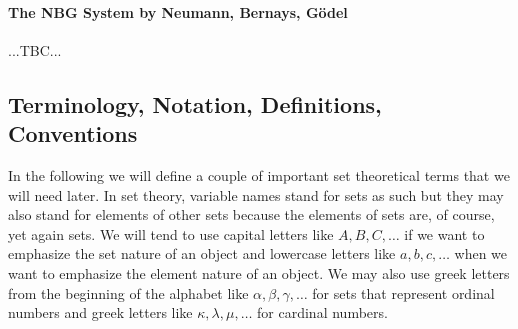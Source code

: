 

\paragraph{The NBG System by Neumann, Bernays, Gödel} ...TBC...








\subsection{Terminology, Notation, Definitions, Conventions}
In the following we will define a couple of important set theoretical terms that we will need later. In set theory, variable names stand for sets as such but they may also stand for elements of other sets because the elements of sets are, of course, yet again sets. We will tend to use capital letters like $A,B,C,\ldots$ if we want to emphasize the set nature of an object and lowercase letters like $a,b,c,\ldots$ when we want to emphasize the element nature of an object. We may also use greek letters from the beginning of the alphabet like $\alpha,\beta,\gamma, \ldots$ for sets that represent ordinal numbers and greek letters like $\kappa,\lambda,\mu,\ldots$ for cardinal numbers.


